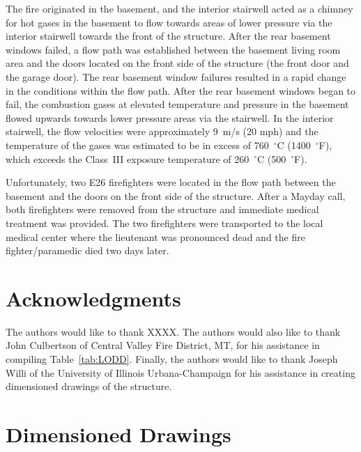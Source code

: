 \documentclass[12pt,oneside]{book}
\begin{document}
The fire originated in the basement, and the interior stairwell acted as a chimney for hot gases in the basement to flow towards areas of lower pressure via the interior stairwell towards the front of the structure. After the rear basement windows failed, a flow path was established between the basement living room area and the doors located on the front side of the structure (the front door and the garage door). The rear basement window failures resulted in a rapid change in the conditions within the flow path. After the rear basement windows began to fail, the combustion gases at elevated temperature and pressure in the basement flowed upwards towards lower pressure areas via the stairwell. In the interior stairwell, the flow velocities were approximately 9~m/s (20 mph) and the temperature of the gases was estimated to be in excess of 760~$^{\circ}$C (1400~$^{\circ}$F), which exceeds the Class~III exposure temperature of 260~$^{\circ}$C (500~$^{\circ}$F).

Unfortunately, two E26 firefighters were located in the flow path between the basement and the doors on the front side of the structure. After a Mayday call, both firefighters were removed from the structure and immediate medical treatment was provided. The two firefighters were transported to the local medical center where the lieutenant was pronounced dead and the fire fighter/paramedic died two days later.


\chapter*{Acknowledgments}

The authors would like to thank XXXX. The authors would also like to thank John Culbertson of Central Valley Fire District, MT, for his assistance in compiling Table~\ref{tab:LODD}. Finally, the authors would like to thank Joseph Willi of the University of Illinois Urbana-Champaign for his assistance in creating dimensioned drawings of the structure.



\appendix

\chapter{Dimensioned Drawings}
\label{sec:drawings}
\end{document}

